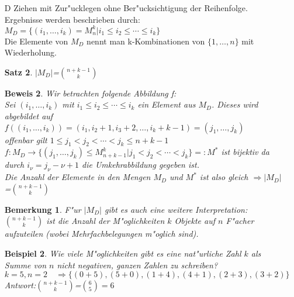 \documentclass[a4paper,11pt]{book}
\newtheorem{Sa}{Satz}[chapter]
\newtheorem{Bsp}{Beispiel}[chapter]
\newtheorem{Bem}{Bemerkung}[chapter]
\theoremstyle{nonumberplain}
\newtheorem{Bew}{Beweis}
\begin{document}
\begin{itemize}
	\begin{Sa}
	$|M_C|$=$n\choose k$=$\frac{n!}{k!\cdot(n-k)!}$
	\end{Sa}
	\begin{Bew} Ber"ucksichtigt man die Reihenfolge, so kann jedes Element aus $M_C$ auf $k!$ verschiedene Arten dargestellt werden. Also gilt der Zusammenhang: $|M_C|\cdot k!=|M_B| \Rightarrow |M_C|=\frac{n!}{k!\cdot(n-k)!}$
	\end{Bew}
	\begin{Bsp}[Lotto: 6 aus 49]
	Es gibt $\binom{49}{6}=13983816$ verschiedene Ziehungsergebnisse
	\end{Bsp}
	\item [D] Ziehen mit Zur"ucklegen ohne Ber"ucksichtigung der Reihenfolge.\\
 Ergebnisse werden beschrieben durch:\\
	$M_D=\{(i_1,\ldots,i_k)= M_n^k| i_1\leq i_2\leq\cdots\leq i_k\}$\\
	Die Elemente von $M_D$ nennt man k-Kombinationen von $\{1,\ldots,n\}$ mit Wiederholung.
	\begin{Sa}
	$|M_D|$=$n+k-1\choose k$
	\end{Sa}
	\begin{Bew} Wir betrachten folgende Abbildung f:\\
	Sei $(i_1,\ldots,i_k)$ mit $i_1\leq i_2\leq\cdots\leq i_k$ ein Element aus $M_D$. Dieses wird abgebildet auf $f((i_1,\ldots,i_k))=(i_1,i_2+1,i_3+2,\ldots,i_k+k-1)=(j_1,\ldots,j_k)$\\
	offenbar gilt $1\leq j_1<j_2<\cdots <j_k\leq n+k-1$\\
	$f:M_D\rightarrow \{(j_1,\ldots,j_k)\leq M_{n+k-1}^k |j_1<j_2<\cdots <j_k\}=: M^*$
	ist bijektiv da durch $i_\nu=j_\nu-\nu+1$ die Umkehrabbildung gegeben ist.\\
	Die Anzahl der Elemente in den Mengen $M_D$ und $M^*$ ist also gleich $\Rightarrow |M_D|$=$n+k-1\choose k$
	\end{Bew}
	\begin{Bem}
	F"ur $|M_D|$ gibt es auch eine weitere Interpretation:\\
	$n+k-1\choose k$ ist die Anzahl der M"oglichkeiten $k$ Objekte auf $n$ F"acher aufzuteilen (wobei Mehrfachbelegungen m"oglich sind).
	\end{Bem}
	\begin{Bsp}
	Wie viele M"oglichkeiten gibt es eine nat"urliche Zahl $k$ als Summe von $n$ nicht negativen, ganzen Zahlen zu schreiben?\\
	$k=5, n=2 \quad \Rightarrow\{(0+5),(5+0),(1+4),(4+1),(2+3),(3+2)\}$\\ 
	Antwort:$n+k-1\choose k$=$\binom{6}{5}=6$
	\end{Bsp}
	\end{itemize}
\end{document}
